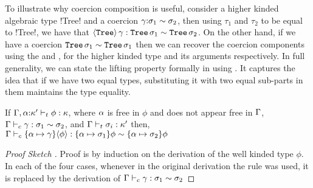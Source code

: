 \documentclass[screen,nonacm,manuscript,review]{acmart} %
\begin{document}
To illustrate why coercion composition is useful, consider a higher
kinded algebraic type !Tree! and a coercion
$\gamma{:}\sigma_1\sim\sigma_2$, then using $\tau_1$ and $\tau_2$ to be
equal to !Tree!, we have that $\langle{\texttt{Tree}}\rangle \,\gamma :
\texttt{Tree}\,\sigma_1 \sim \texttt{Tree}\,\sigma_2$. On the
other hand, if we have a coercion $\texttt{Tree}\,\sigma_1 \sim
\texttt{Tree}\,\sigma_1$ then we can recover the coercion components
using the  and , for the higher kinded
type and its arguments respectively. In full generality, we can state
the lifting property formally in \SFC using
. It captures the idea that
if we have two equal types, substituting it with two equal sub-parts
in them maintains the type equality.

\begin{theorem}\label{thm:sfc-coercion-lifting}
 If $\Gamma,\alpha{:}\kappa' \vdash_{t} \phi : \kappa$, where $\alpha$ is free in $\phi$
 and does not appear free in $\Gamma$,
 $\Gamma \vdash_{c} \gamma : \sigma_1\sim\sigma_2$, and $\Gamma \vdash_{t} \sigma_i : \kappa'$
 then, $\Gamma \vdash_{c} \{\alpha\mapsto \gamma\}\langle{\phi}\rangle : \{\alpha\mapsto\sigma_1\}\phi\sim\{\alpha\mapsto\sigma_2\}\phi$
\end{theorem}
\begin{proof}[Proof Sketch ]
 Proof is by induction on the derivation of the well kinded type
 $\phi$. In each of the four cases, whenever in the original
 derivation the rule  was used, it is replaced by the
 derivation of $\Gamma \vdash_{c} \gamma : \sigma_1\sim\sigma_2$
\end{proof}

\newcommand\TVar{
 \ib{\irule[\trule{var}]
 {x\co\tau \in \TEnv};
 {\Typing \TEnv x \tau}
 }
}

\newcommand\TAbs{
 \ib{\irule[\trule{\I\to}]
 {\Typing {\TEnv,x\co\sigma} {M} {\tau}};
 {\Typing \TEnv {\Lam x M} {\sigma \to \tau}}
 }
}
\newcommand\TApp{
 \ib{\irule[\trule{\E\to}]
 {\Typing \TEnv \Tm {\sigma \to \tau}}
 {\Typing \TEnv N \sigma};
 {\Typing \TEnv {\Tm \App N} {\tau}}
 }
}
\newcommand\TTyApp{
 \ib{\irule[\trule{\E\forall}]
 {\Typing  \TEnv \Tm {\Forall {\alpha\co\kappa} \tau}}
 {\Kinding \TEnv \sigma \kappa};
 {\Typing  \TEnv {M\App\sigma} {\tau}}
 }
}

\newcommand\TTyAbs{
 \ib{\irule[\trule{\I\forall}]
   {\Typing {\TEnv,\alpha\co\kappa} \Tm \tau}
   {\alpha\#\TEnv};
   {\Typing \TEnv {\Forall {\alpha\co\kappa} \Tm} {\tau}}
 }
}
\end{document}
